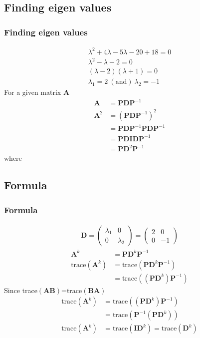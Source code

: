\documentclass{beamer}
\providecommand{\brak}[1]{\ensuremath{\left(#1\right)}}
\theoremstyle{remark}
\newcommand{\myvec}[1]{\ensuremath{\begin{pmatrix}#1\end{pmatrix}}}
\let\vec\mathbf
\numberwithin{equation}{section}
\begin{document}
\subsection{Finding eigen values}
\begin{frame}
\frametitle{Finding eigen values}
 \begin{align}
     \lambda^2+4\lambda-5\lambda-20+18=0 \\
            \lambda^2-\lambda-2=0 \\
            \brak{\lambda-2}\brak{\lambda+1}=0 \\
            \lambda_1=2\ \brak{\text{and}}\ \lambda_2=-1
 \end{align}
 For a given matrix $\vec{A}$
\begin{align}
     \vec{A}&=\vec{P}\vec{D}\vec{P}^{-1} \\
      \vec{A}^2&=\brak{\vec{P}\vec{D}\vec{P}^{-1}}^2 \\
      &=\vec{P}\vec{D}\vec{P}^{-1}\vec{P}\vec{D}\vec{P}^{-1}\\
      &=\vec{P}\vec{D}\vec{I}\vec{D}\vec{P}^{-1}\\
      &=\vec{P}\vec{D}^2\vec{P}^{-1}
 \end{align}
 where
 \end{frame}
 \subsection{Formula}
\begin{frame}
\frametitle{Formula}
 \begin{align}
\vec{D}=\myvec{\lambda_1&0\\0&\lambda_2}=\myvec{2&0\\0&-1}
 \end{align}
 \begin{align}
     \vec{A}^k&=\vec{P}\vec{D}^k\vec{P}^{-1}\\
\text{trace}\brak{\vec{A}^k}&=\text{trace}\brak{\vec{P}\vec{D}^k\vec{P}^{-1}} \\
&=\text{trace}\brak{\brak{\vec{P}\vec{D}^k}\vec{P}^{-1}}
     \end{align}
     Since trace$\brak{\vec{AB}}$=trace$\brak{\vec{BA}}$
     \begin{align}
\text{trace}\brak{\vec{A}^k}&=\text{trace}\brak{\brak{\vec{P}\vec{D}^k}\vec{P}^{-1}}  \\
&=\text{trace}\brak{\vec{P}^{-1}\brak{\vec{P}\vec{D}^k}}  \\
\text{trace}\brak{\vec{A}^k}&=\text{trace}\brak{\vec{I}\vec{D}^k}=\text{trace}\brak{\vec{D}^k}
     \end{align}
\end{frame}
\end{document}
